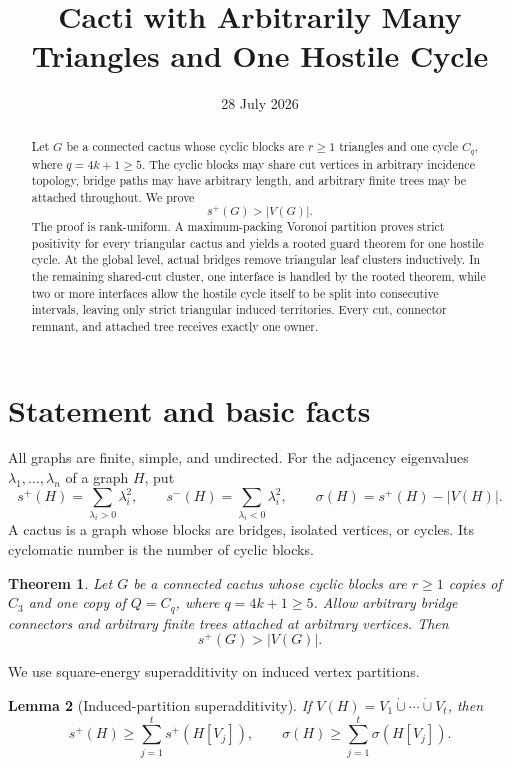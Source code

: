 \documentclass[11pt]{article}
\title{Cacti with Arbitrarily Many Triangles and One Hostile Cycle}
\author{}
\date{28 July 2026}
\newtheorem{theorem}{Theorem}[section]
\newtheorem{lemma}[theorem]{Lemma}
\theoremstyle{remark}
\newcommand{\splus}{s^+}
\newcommand{\sminus}{s^-}
\newcommand{\sig}{\sigma}
\begin{document}
\maketitle

\begin{abstract}
Let $G$ be a connected cactus whose cyclic blocks are $r\geq1$ triangles and
one cycle $C_q$, where $q=4k+1\geq5$.  The cyclic blocks may share cut
vertices in arbitrary incidence topology, bridge paths may have arbitrary
length, and arbitrary finite trees may be attached throughout.  We prove
\[
 \splus(G)>|V(G)|.
\]
The proof is rank-uniform.  A maximum-packing Voronoi partition proves strict
positivity for every triangular cactus and yields a rooted guard theorem for
one hostile cycle.  At the global level, actual bridges remove triangular leaf
clusters inductively.  In the remaining shared-cut cluster, one interface is
handled by the rooted theorem, while two or more interfaces allow the hostile
cycle itself to be split into consecutive intervals, leaving only strict
triangular induced territories.  Every cut, connector remnant, and attached
tree receives exactly one owner.
\end{abstract}

\section{Statement and basic facts}

All graphs are finite, simple, and undirected.  For the adjacency eigenvalues
$\lambda_1,\ldots,\lambda_n$ of a graph $H$, put
\[
 \splus(H)=\sum_{\lambda_i>0}\lambda_i^2,
 \qquad
 \sminus(H)=\sum_{\lambda_i<0}\lambda_i^2,
 \qquad
 \sig(H)=\splus(H)-|V(H)|.
\]
A cactus is a graph whose blocks are bridges, isolated vertices, or cycles.
Its cyclomatic number is the number of cyclic blocks.

\begin{theorem}\label{thm:main}
Let $G$ be a connected cactus whose cyclic blocks are $r\geq1$ copies of
$C_3$ and one copy of $Q=C_q$, where $q=4k+1\geq5$.  Allow arbitrary bridge
connectors and arbitrary finite trees attached at arbitrary vertices.  Then
\[
 \boxed{\splus(G)>|V(G)|}.
\]
\end{theorem}

We use square-energy superadditivity on induced vertex partitions.

\begin{lemma}[Induced-partition superadditivity]\label{lem:super}
If $V(H)=V_1\dot\cup\cdots\dot\cup V_t$, then
\[
 \splus(H)\geq\sum_{j=1}^t\splus(H[V_j]),
 \qquad
 \sig(H)\geq\sum_{j=1}^t\sig(H[V_j]).
\]
\end{lemma}
\end{document}
